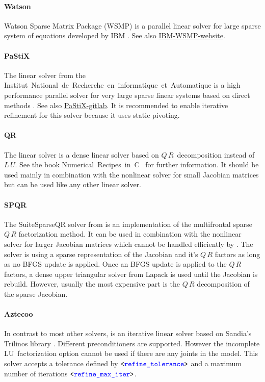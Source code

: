 \paragraph{Watson}
Watson Sparse Matrix Package (WSMP) is a parallel linear solver for large sparse system of equations developed by IBM \cite{10.1145/569147.569149}.
See also \href{https://researcher.watson.ibm.com/researcher/view_group.php?id=1426}{IBM-WSMP-website}.

\paragraph{PaStiX}
The  linear solver from the Institut~National~de~Recherche~en~informatique~et~Automatique
is a high performance parallel solver for very large sparse linear systems based on direct methods \cite{henon:inria-00346017}.
See also \href{https://gitlab.inria.fr/solverstack/pastix}{PaStiX-gitlab}.
It is recommended to enable iterative refinement for this solver because it uses static pivoting.

\paragraph{QR}
The  linear solver is a dense linear solver based on $Q\,R$~decomposition instead of $L\,U$.
See the book Numerical~Recipes~in~{C}~\cite{NUMERICAL-RECIPES-IN-C} for further information.
It should be used mainly in combination with the  nonlinear solver for small Jacobian
matrices but can be used like any other linear solver.

\paragraph{SPQR}
The SuiteSparseQR solver  from \cite{SUITESPARSE-QR-2011} is an implementation
of the multifrontal sparse $Q\,R$ factorization method. It can be used in combination
with the  nonlinear solver for larger Jacobian matrices which cannot be
handled efficiently by . The  solver is using a sparse representation
of the Jacobian and it's $Q\,R$ factors as long as no BFGS update is applied.
Once an BFGS update is applied to the $Q\,R$ factors, a dense upper triangular solver
from Lapack is used until the Jacobian is rebuild. However, usually the most expensive
part is the $Q\,R$ decomposition of the sparse Jacobian.

\paragraph{Aztecoo}
In contrast to most other solvers,  is an iterative linear solver based on
Sandia's Trilinos library \cite{TRILINOS-WEBSITE}. Different preconditioners are supported.
However the incomplete LU~factorization option  cannot be used if there are any
joints in the model. This solver accepts a tolerance defined by $\texttt{<\textcolor{blue}{refine\_tolerance}>}$ and
a maximum number of iterations $\texttt{<\textcolor{blue}{refine\_max\_iter}>}$.

